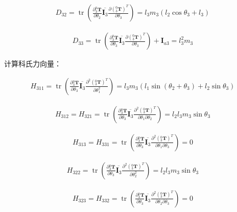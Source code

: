 \documentclass{homework}
\begin{document}
\begin{sol}
\begin{align*}
  D_{32} = \operatorname{tr} (\frac{\partial {^0_3}\mathbf{T}}{\partial \theta_2} \overline{\mathbf{I}_3} \frac{\partial ({^0_3}\mathbf{T})^T}{\partial \theta_3}) 
         = l_3 m_3 (l_2 \cos\theta_3 + l_3)
\end{align*}

\begin{align*}
  D_{33} = \operatorname{tr} (\frac{\partial {^0_3}\mathbf{T}}{\partial \theta_3} \overline{\mathbf{I}_3} \frac{\partial ({^0_3}\mathbf{T})^T}{\partial \theta_3}) + \mathbf{I}_{a3}
         = l_3^2 m_3
\end{align*}

计算科氏力向量：

\begin{align*}
  H_{311} = \operatorname{tr} (\frac{\partial {^0_3}\mathbf{T}}{\partial \theta_3} \overline{\mathbf{I}_3} \frac{\partial^2 ({^0_3}\mathbf{T})^T}{\partial \theta_1^2}) 
          = l_3 m_3 (l_1 \sin(\theta_2 + \theta_3) + l_2 \sin\theta_3)
\end{align*}

\begin{align*}
  H_{312} = H_{321} = \operatorname{tr} (\frac{\partial {^0_3}\mathbf{T}}{\partial \theta_3} \overline{\mathbf{I}_3} \frac{\partial^2 ({^0_3}\mathbf{T})^T}{\partial \theta_1 \partial \theta_2})
                    = l_2 l_3 m_3 \sin\theta_3
\end{align*}

\begin{align*}
  H_{313} = H_{331} = \operatorname{tr} (\frac{\partial {^0_3}\mathbf{T}}{\partial \theta_3} \overline{\mathbf{I}_3} \frac{\partial^2 ({^0_3}\mathbf{T})^T}{\partial \theta_1 \partial \theta_3}) 
                    = 0
\end{align*}

\begin{align*}
  H_{322} = \operatorname{tr} (\frac{\partial {^0_3}\mathbf{T}}{\partial \theta_3} \overline{\mathbf{I}_3} \frac{\partial^2 ({^0_3}\mathbf{T})^T}{\partial \theta_2^2})
          = l_2 l_3 m_3 \sin\theta_3
\end{align*}

\begin{align*}
  H_{323} = H_{332} = \operatorname{tr} (\frac{\partial {^0_3}\mathbf{T}}{\partial \theta_3} \overline{\mathbf{I}_3} \frac{\partial^2 ({^0_3}\mathbf{T})^T}{\partial \theta_2 \partial \theta_3}) 
                    = 0
\end{align*}


\end{sol}
\end{document}
